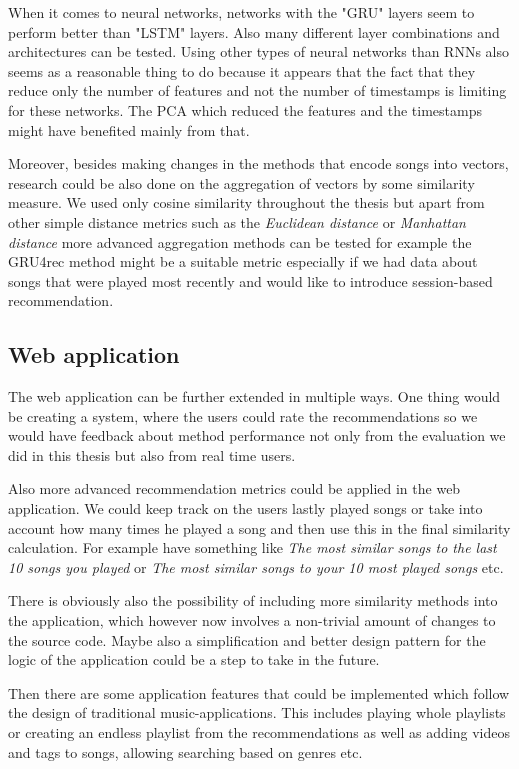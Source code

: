 When it comes to neural networks, networks with the "GRU" layers seem to perform better than "LSTM" layers. Also many different layer combinations and architectures can be tested. Using other types of neural networks than RNNs also seems as a reasonable thing to do because it appears that the fact that they reduce only the number of features and not the number of timestamps is limiting for these networks. The PCA which reduced the features and the timestamps might have benefited mainly from that. 

Moreover, besides making changes in the methods that encode songs into vectors, research could be also done on the aggregation of vectors by some similarity measure. We used only cosine similarity throughout the thesis but apart from other simple distance metrics such as the \textit{Euclidean distance} or \textit{Manhattan distance} more advanced aggregation methods can be tested for example the GRU4rec \cite{gru4rec_article} method might be a suitable metric especially if we had data about songs that were played most recently and would like to introduce session-based recommendation.

\subsection*{Web application}
The web application can be further extended in multiple ways. One thing would be creating a system, where the users could rate the recommendations so we would have feedback about method performance not only from the evaluation we did in this thesis but also from real time users. 

Also more advanced recommendation metrics could be applied in the web application. We could keep track on the users lastly played songs or take into account how many times he played a song and then use this in the final similarity calculation. For example have something like \textit{The most similar songs to the last 10 songs you played} or \textit{The most similar songs to your 10 most played songs} etc. 

There is obviously also the possibility of including more similarity methods into the application, which however now involves a non-trivial amount of changes to the source code. Maybe also a simplification and better design pattern for the logic of the application could be a step to take in the future. 

Then there are some application features that could be implemented which follow the design of traditional music-applications. This includes playing whole playlists or creating an endless playlist from the recommendations as well as adding videos and tags to songs, allowing searching based on genres etc. 


